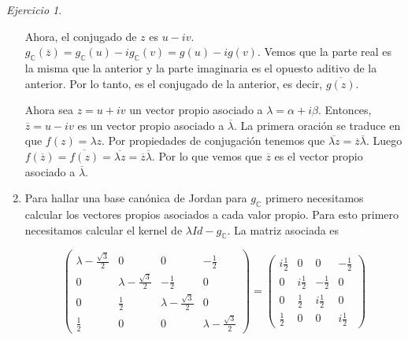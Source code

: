 \documentclass[11pt,a4paper]{article}
\theoremstyle{definition}
\theoremstyle{remark}
\newtheorem{exc}{Ejercicio}
\begin{document}
\begin{exc}
\begin{enumerate}
		 		Ahora, el conjugado de $ z $ es $ u-iv $. $ g_\mathbb{C}(\overline{z})=g_\mathbb{C}(u)-ig_\mathbb{C}(v)=g(u)-ig(v) $. Vemos que la parte real es la misma que la anterior y la parte imaginaria es el opuesto aditivo de la anterior. Por lo tanto, es el conjugado de la anterior, es decir, $ \overline{g(z)} $.
		 		
		 		Ahora sea $ z=u+iv $ un vector propio asociado a $ \lambda=\alpha+i\beta $. Entonces, $ \overline{z}=u-iv $ es un vector propio asociado a $  \overline{\lambda} $.
		 		La primera oración se traduce en que $ f(z)=\lambda z $. Por propiedades de conjugación tenemos que $ \overline{\lambda z}=\overline{z}\overline{\lambda} $. Luego $ f(\overline{z})=\overline{f(z)}= \overline{\lambda z}=\overline{z}\overline{\lambda} $. Por lo que vemos que $ \overline{z} $ es el vector propio asociado a $ \overline{\lambda} $. 
				
				\item Para hallar una base canónica de Jordan para $ g_\mathbb{C} $ primero necesitamos calcular los vectores propios asociados a cada valor propio. Para esto primero necesitamos calcular el kernel de $ \lambda Id-g_\mathbb{C}$. La matriz asociada es
				
				\begin{equation}
				\begin{pmatrix}
				\lambda-\frac{\sqrt{3}}{2} & 0 & 0 & -\frac{1}{2}				\\ 0 & \lambda-\frac{\sqrt{3}}{2} & -\frac{1}{2} & 0 
									\\ 0 & \frac{1}{2} & \lambda-\frac{\sqrt{3}}{2} & 0
									\\ \frac{1}{2} & 0 & 0 & \lambda-\frac{\sqrt{3}}{2}
							\end{pmatrix} =
							\begin{pmatrix}
							i\frac{1}{2} & 0 & 0 & -\frac{1}{2}
									\\ 0 & i\frac{1}{2} & -\frac{1}{2} & 0 
									\\ 0 & \frac{1}{2} & i\frac{1}{2} & 0
									\\ \frac{1}{2} & 0 & 0 & i\frac{1}{2}
							\end{pmatrix}\nonumber
							\end{equation}
							

\end{enumerate}
\end{exc}
\end{document}
